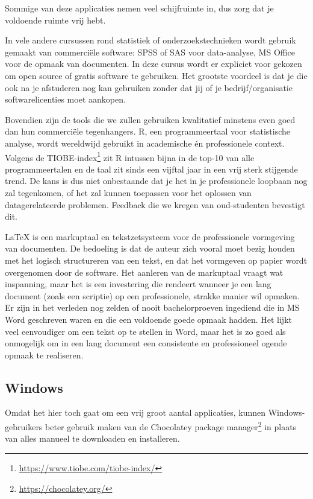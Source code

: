 Sommige van deze applicaties nemen veel schijfruimte in, dus zorg dat je voldoende ruimte vrij hebt.

In vele andere cursussen rond statistiek of onderzoekstechnieken wordt gebruik gemaakt van commerciële software: SPSS of SAS voor data-analyse, MS Office voor de opmaak van documenten. In deze cursus wordt er expliciet voor gekozen om open source of gratis software te gebruiken. Het grootste voordeel is dat je die ook na je afstuderen nog kan gebruiken zonder dat jij of je bedrijf/organisatie softwarelicenties moet aankopen.

Bovendien zijn de tools die we zullen gebruiken kwalitatief minstens even goed dan hun commerciële tegenhangers. R, een programmeertaal voor statistische analyse, wordt wereldwijd gebruikt in academische én professionele context. Volgens de TIOBE-index\footnote{\url{https://www.tiobe.com/tiobe-index/}} zit R intussen bijna in de top-10 van alle programmeertalen en de taal zit sinds een vijftal jaar in een vrij sterk stijgende trend. De kans is dus niet onbestaande dat je het in je professionele loopbaan nog zal tegenkomen, of het zal kunnen toepassen voor het oplossen van datagerelateerde problemen. Feedback die we kregen van oud-studenten bevestigt dit.

\LaTeX{} is een markuptaal en tekstzetsysteem voor de professionele vormgeving van documenten. De bedoeling is dat de auteur zich vooral moet bezig houden met het logisch structureren van een tekst, en dat het vormgeven op papier wordt overgenomen door de software. Het aanleren van de markuptaal vraagt wat inspanning, maar het is een investering die rendeert wanneer je een lang document (zoals een scriptie) op een professionele, strakke manier wil opmaken. Er zijn in het verleden nog zelden of nooit bachelorproeven ingediend die in MS Word geschreven waren en die een voldoende goede opmaak hadden. Het lijkt veel eenvoudiger om een tekst op te stellen in Word, maar het is zo goed als onmogelijk om in een lang document een consistente en professioneel ogende opmaak te realiseren.

\subsection{Windows}

Omdat het hier toch gaat om een vrij groot aantal applicaties, kunnen Windows-gebruikers beter gebruik maken van de Chocolatey package manager\footnote{\url{https://chocolatey.org/}} in plaats van alles manueel te downloaden en installeren.

